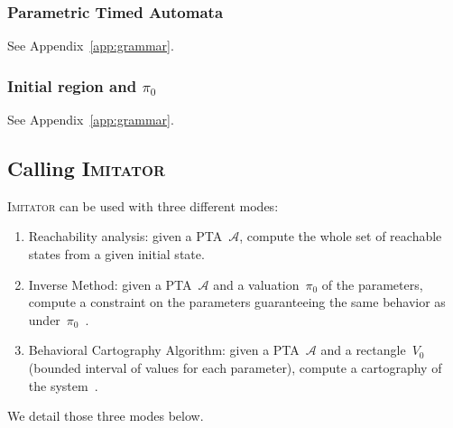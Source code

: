 \documentclass[a4paper,11pt]{article}
\newcommand{\A}{\mathcal{A}}
\newcommand{\hytech}{{\sc HyTech}}
\newcommand{\imitator}{\textsc{Imitator}}
\begin{document}


\subsubsection{Parametric Timed Automata}

See Appendix~\ref{app:grammar}.

\subsubsection{Initial region and $\pi_0$}

See Appendix~\ref{app:grammar}.


\subsection{Calling \imitator}

\imitator{} can be used with three different modes:

\begin{enumerate}
	\item Reachability analysis: given a PTA~$\A$, compute the whole set of reachable states from a given initial state.
	\item Inverse Method: given a PTA~$\A$ and a valuation~$\pi_0$ of the parameters, compute a constraint on the parameters guaranteeing the same behavior as under~$\pi_0$~\cite{AS13}.
	\item Behavioral Cartography Algorithm: given a PTA~$\A$ and a rectangle~$V_0$ (bounded interval of values for each parameter), compute a cartography of the system~\cite{af10}.
\end{enumerate}

We detail those three modes below.

\end{document}
